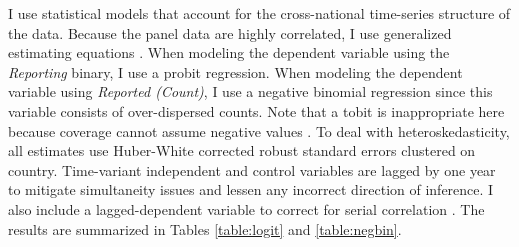 \documentclass[11pt, oneside]{article}
\begin{document}
I use statistical models that account for the cross-national time-series structure of the data. Because the panel data are highly correlated, I use generalized estimating equations \cite{zorn2001}. When modeling the dependent variable using the \emph{Reporting} binary, I use a probit regression. When modeling the dependent variable using \emph{Reported (Count)}, I use a negative binomial regression since this variable consists of over-dispersed counts. Note that a tobit is inappropriate here because coverage cannot assume negative values \cite{sigelman1999}. To deal with heteroskedasticity, all estimates use Huber-White corrected robust standard errors clustered on country.  Time-variant independent and control variables are lagged by one year to mitigate simultaneity issues and lessen any incorrect direction of inference. I also include a lagged-dependent variable to correct for serial correlation \cite{wooldridge2010}. The results are summarized in Tables \ref{table:logit} and \ref{table:negbin}.
\end{document}
